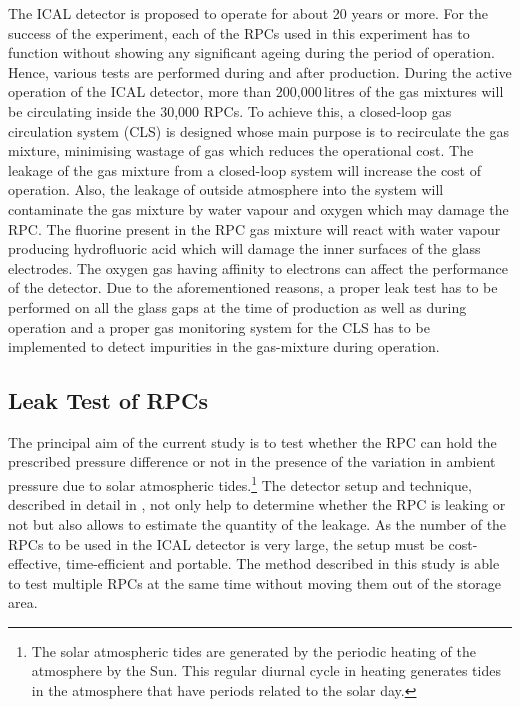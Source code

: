 The ICAL detector is proposed to operate for about 20 years or more. For the success of the experiment, each of the RPCs used in this experiment has to function without showing any significant ageing during the period of operation. Hence, various tests are performed during and after production. During the active operation of the ICAL detector, more than 200,000\,litres of the gas mixtures will be circulating inside the 30,000 RPCs. To achieve this, a closed-loop gas circulation system (CLS) is designed whose main purpose is to recirculate the gas mixture, minimising wastage of gas which reduces the operational cost. The leakage of the gas mixture from a closed-loop system will increase the cost of operation. Also, the leakage of outside atmosphere into the system will contaminate the gas mixture by water vapour and oxygen which may damage the RPC\cite{rpc_c,rpc_w}. The fluorine present in the RPC gas mixture will react with water vapour producing hydrofluoric acid which will damage the inner surfaces of the glass electrodes. The oxygen gas having affinity to electrons can affect the performance of the detector. Due to the aforementioned reasons, a proper leak test has to be performed on all the glass gaps at the time of production as well as during operation and a proper gas monitoring system for the CLS has to be implemented to detect impurities in the gas-mixture during operation.

\subsection*{Leak Test of RPCs}
The principal aim of the current study is to test whether the RPC can hold the prescribed pressure difference or not in the presence of the variation in ambient pressure due to solar atmospheric tides.\footnote{The solar atmospheric tides are generated by the periodic heating of the atmosphere by the Sun. This regular diurnal cycle in heating generates tides in the atmosphere that have periods related to the solar day.} The detector setup and technique, described in detail in \cite{rpcleak}, not only help to determine whether the RPC is leaking or not but also allows to estimate the quantity of the leakage. As the number of the RPCs to be used in the ICAL detector is very large, the setup must be cost-effective, time-efficient and portable. The method described in this study is able to test multiple RPCs at the same time without moving them out of the storage area.

